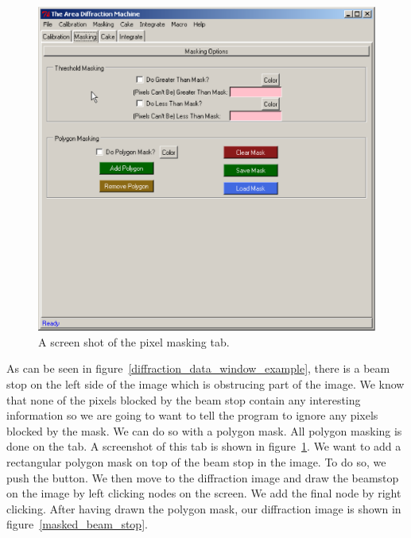 \begin{figure}
    \centering
    \includegraphics[scale=.75]{figures/masking_tab.eps}
    \caption{A screen shot of the pixel masking tab.}
    \label{masking_tab_example}
\end{figure}

As can be seen in figure~\ref{diffraction_data_window_example},
there is a beam stop on the left side of the image which is
obstrucing part of the image. We know that none of the pixels
blocked by the beam stop contain any interesting information
so we are going to want to tell the program to ignore any pixels
blocked by the mask. We can do so with a polygon mask. All
polygon masking is done on the  tab. A screenshot
of this tab is shown in figure~\ref{masking_tab_example}.
We want to add a rectangular polygon mask on top of the beam
stop in the image. To do so, we push the  button.
We then move to the diffraction image and draw the beamstop
on the image by left clicking nodes on the screen. We add the
final node by right clicking. After having drawn the polygon mask, 
our diffraction image is shown in figure~\ref{masked_beam_stop}.

